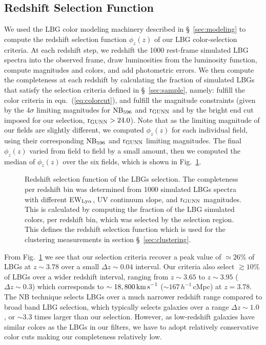\documentclass[iop, revtex4]{emulateapj}
\begin{document}
\subsection{Redshift Selection Function}
\label{sec:comple}

We used the LBG color modeling machinery described
in \S~\ref{sec:modeling} to compute the redshift
selection function $\phi_{z}(z)$ of our LBG color-selection criteria. At each redshift
step, we redshift the 1000 rest-frame simulated LBG spectra into the observed frame,
draw luminosities from the luminosity function, compute  magnitudes and colors,
and add photometric errors. 
We then compute the completeness at each redshift by calculating the
fraction of simulated LBGs that satisfy the selection criteria defined
in \S~\ref{sec:sample}, namely: fulfill the color criteria in
eqn.~(\ref{eq:colorcut}), and fulfill the magnitude constraints (given
by the $4\sigma$ limiting magnitudes for $\rm NB_{596}$ and $\rm
r_{GUNN}$ and by the bright end cut imposed for our selection, $\rm
r_{GUNN}>24.0$).
Note that as the limiting magnitude of our fields
are slightly different, we computed $\phi_{z}(z)$ for each individual field, using their corresponding 
$\rm NB_{596}$ and $\rm r_{GUNN}$ limiting magnitudes. 
The final $\phi_{z}(z)$ varied from field to field by a small amount,
then we computed the median of $\phi_{z}(z)$ over the six fields, 
which is shown in Fig.~\ref{fig:completeness}.

\begin{figure}
\caption{Redshift selection function of the LBGs selection. The completeness per redshift bin was determined from 1000 simulated LBGs spectra with different EW$_{\rm Ly\alpha}$, UV continuum slope, and $\rm r_{GUNN}$ magnitudes. This is calculated by computing the fraction of the LBG simulated colors, per redshift bin, which was selected by the selection region. This defines the redshift selection function which is used for the clustering measurements in section \S~\ref{sec:clustering}.\\}
\label{fig:completeness}
\end{figure}

From Fig.~\ref{fig:completeness} we see that our selection criteria
recover a peak value of 
$\simeq 26\%$ of LBGs at $z\sim3.78$ over a small $\Delta z\sim0.04$
interval. Our criteria also select $\gtrsim10\%$ of LBGs
over  a wider redshift interval, ranging from $z\sim3.65$ to $z\sim3.95$
($\Delta z\sim0.3$) which corresponds to $\sim18,800\,{\rm
  km\,s}^{-1}$ ($\sim 167\,h^{-1}$\,cMpc) at $z=3.78$. The NB technique selects 
  LBGs over a much narrower redshift range compared to broad band
LBG  selection, which typically selects galaxies over a range $\Delta z\sim 1.0$ \citep[e.g.][]{Ouchi04a, Bouwens07, Bouwens10}, or $\sim3.3$ times larger than our selection. 
However, as low-redshift galaxies have similar colors as the LBGs in our filters, we
have to adopt relatively conservative color cuts making our completeness
relatively low. 
\end{document}
